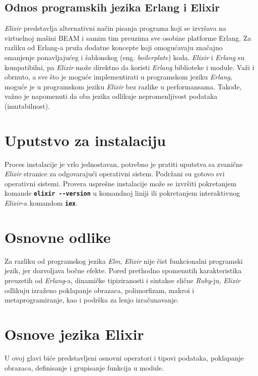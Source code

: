 \documentclass[12pt,oneside]{memoir}
\begin{document}
\subsection{Odnos programskih jezika Erlang i Elixir}
\emph{Elixir} predstavlja alternativni način pisanja programa koji se izvršava na virtuelnoj
mašini BEAM i samim tim preuzima sve osobine platforme Erlang. Za razliku od Erlang-a pruža dodatne
koncepte koji omogućavaju značajno smanjenje ponavljajućeg i šablonskog (eng.
\emph{boilerplate}) koda. \emph{Elixir} i \emph{Erlang} su kompatibilni, pa \emph{Elixir} može direktno da koristi
\emph{Erlang} biblioteke i module. Važi i obrnuto, a sve što je moguće implementirati u programskom jeziku \emph{Erlang},
moguće je u programskom jeziku \emph{Elixir} bez razlike u performansama. Takođe, važno je napomenuti da oba jezika
odlikuje nepromenljivost podataka (imutabilnost).
\section{Uputstvo za instalaciju}
Proces instalacije je vrlo jednostavan, potrebno je pratiti uputstva sa zvanične \emph{Elixir}
stranice \cite{elixir} za odgovarajući operativni sistem. Podržani su gotovo svi operativni
sistemi. Provera usprešne instalacije može se izvršiti pokretanjem komande
\textbf{\texttt{elixir -{}-version}} u komandnoj liniji ili pokretanjem interaktivnog \emph{Elixir}-a
komandom \textbf{\texttt{iex}}.
\section{Osnovne odlike}
Za razliku od programskog jezika \emph{Elm}, \emph{Elixir} nije čist funkcionalni programski jezik, jer dozvoljava bočne efekte.
Pored prethodno spomenutih karakteristika preuzetih od \emph{Erlang}-a, dinamičke tipiziranosti i 
sintakse slične \emph{Ruby}-ju, \emph{Elixir} odlikuju izraženo poklapanje obrazaca, polimorfizam, makroi
i metaprogramiranje, kao i podrška za lenjo izračunavanje.   
\section{Osnove jezika Elixir}
U ovoj glavi biće predstavljeni osnovni operatori i tipovi podataka, poklapanje obrazaca,
definisanje i grupisanje funkcija u module. 
\end{document}
